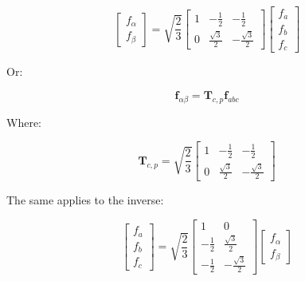 \documentclass{article}
\begin{document}
\begin{equation}
    \begin{bmatrix}
        f_{\alpha} \\
        f_{\beta}
    \end{bmatrix}
    =
    \sqrt{\frac{2}{3}}
    \begin{bmatrix}
        1 & -\frac{1}{2} & -\frac{1}{2} \\[2mm]
        0 & \frac{\sqrt{3}}{2} & -\frac{\sqrt{3}}{2}
    \end{bmatrix}
    \begin{bmatrix}
        f_a \\
        f_b \\
        f_c
    \end{bmatrix}
\end{equation}

Or:

\begin{equation}
    \mathbf{f}_{\alpha\beta}
    =
    \mathbf{T}_{c,p}\mathbf{f}_{abc}
\end{equation}

Where:

\begin{equation}
    \mathbf{T}_{c,p}
    =
    \sqrt{\frac{2}{3}}
    \begin{bmatrix}
        1 & -\frac{1}{2} & -\frac{1}{2} \\[2mm]
        0 & \frac{\sqrt{3}}{2} & -\frac{\sqrt{3}}{2}
    \end{bmatrix}
\end{equation}

The same applies to the inverse:

\begin{equation}
    \begin{bmatrix}
        f_a \\
        f_b \\
        f_c
    \end{bmatrix}
    =
    \sqrt{\frac{2}{3}}
    \begin{bmatrix}
        1 & 0 \\[2mm]
        -\frac{1}{2} & \frac{\sqrt{3}}{2} \\[2mm]
        -\frac{1}{2} & -\frac{\sqrt{3}}{2}
    \end{bmatrix}
    \begin{bmatrix}
        f_{\alpha} \\
        f_{\beta}
    \end{bmatrix}
\end{equation}
\end{document}
